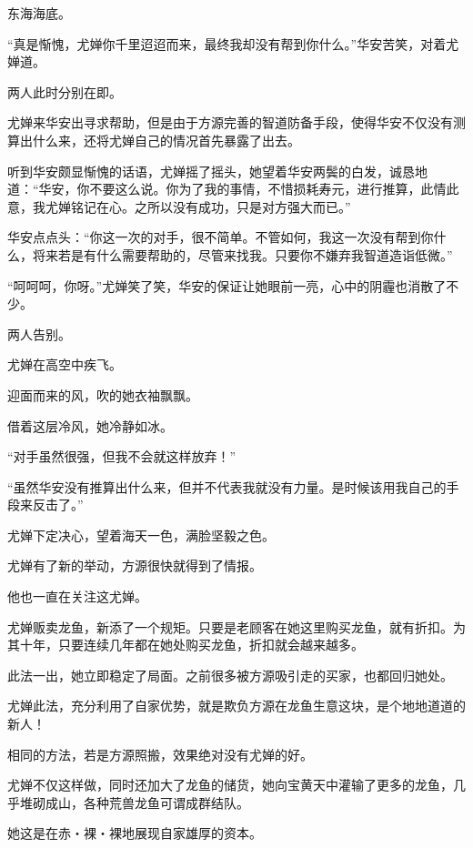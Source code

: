 
\begin{this_body}

东海海底。

“真是惭愧，尤婵你千里迢迢而来，最终我却没有帮到你什么。”华安苦笑，对着尤婵道。

两人此时分别在即。

尤婵来华安出寻求帮助，但是由于方源完善的智道防备手段，使得华安不仅没有测算出什么来，还将尤婵自己的情况首先暴露了出去。

听到华安颇显惭愧的话语，尤婵摇了摇头，她望着华安两鬓的白发，诚恳地道：“华安，你不要这么说。你为了我的事情，不惜损耗寿元，进行推算，此情此意，我尤婵铭记在心。之所以没有成功，只是对方强大而已。”

华安点点头：“你这一次的对手，很不简单。不管如何，我这一次没有帮到你什么，将来若是有什么需要帮助的，尽管来找我。只要你不嫌弃我智道造诣低微。”

“呵呵呵，你呀。”尤婵笑了笑，华安的保证让她眼前一亮，心中的阴霾也消散了不少。

两人告别。

尤婵在高空中疾飞。

迎面而来的风，吹的她衣袖飘飘。

借着这层冷风，她冷静如冰。

“对手虽然很强，但我不会就这样放弃！”

“虽然华安没有推算出什么来，但并不代表我就没有力量。是时候该用我自己的手段来反击了。”

尤婵下定决心，望着海天一色，满脸坚毅之色。

尤婵有了新的举动，方源很快就得到了情报。

他也一直在关注这尤婵。

尤婵贩卖龙鱼，新添了一个规矩。只要是老顾客在她这里购买龙鱼，就有折扣。为其十年，只要连续几年都在她处购买龙鱼，折扣就会越来越多。

此法一出，她立即稳定了局面。之前很多被方源吸引走的买家，也都回归她处。

尤婵此法，充分利用了自家优势，就是欺负方源在龙鱼生意这块，是个地地道道的新人！

相同的方法，若是方源照搬，效果绝对没有尤婵的好。

尤婵不仅这样做，同时还加大了龙鱼的储货，她向宝黄天中灌输了更多的龙鱼，几乎堆砌成山，各种荒兽龙鱼可谓成群结队。

她这是在赤・裸・裸地展现自家雄厚的资本。


\end{this_body}
